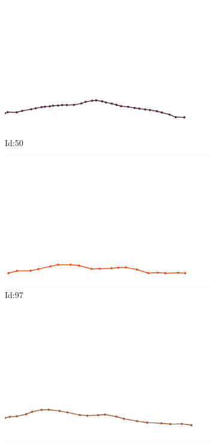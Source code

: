 \documentclass[12pt,twoside]{report}
\begin{document}
\begin{figure}
\centering
\begin{subfigure}[b]{0.20\textwidth}
\centering
\includegraphics[width=\textwidth]{../../trajectories/50.png}
\caption{Id:50}
\end{subfigure}
\begin{subfigure}[b]{0.20\textwidth}
\centering
\includegraphics[width=\textwidth]{../../trajectories/97.png}
\caption{Id:97}
\end{subfigure}
\begin{subfigure}[b]{0.20\textwidth}
\centering
\includegraphics[width=\textwidth]{../../trajectories/184.png}

\end{subfigure}
\end{figure}
\end{document}
